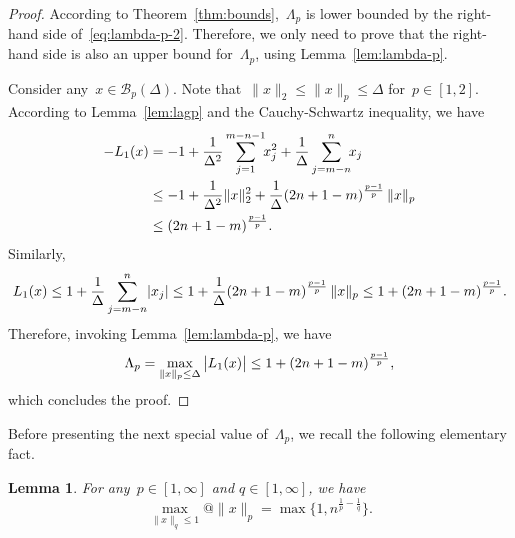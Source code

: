 \documentclass{article}
\numberwithin{equation}{section}
\theoremstyle{definition}
\theoremstyle{plain}
\newtheorem{lemma}{Lemma}[section]
\theoremstyle{remark}
\newcommand*{\abs}[2][]{#1\lvert#2#1\rvert}
\newcommand*{\lagp}[1][]{L\ifblank{#1}{}{_{#1}}}
\newcommand*{\norm}[2][]{#1\lVert#2#1\rVert}
\begin{document}
\begin{proof}
    According to Theorem~\ref{thm:bounds},~$\Lambda_p$ is lower bounded by the right-hand side of~\eqref{eq:lambda-p-2}.
    Therefore, we only need to prove that the right-hand side is also an upper bound for~$\Lambda_p$, using Lemma~\ref{lem:lambda-p}.

    Consider any~$x \in \mathcal{B}_p(\Delta)$. Note that~$\norm{x}_2 \le\norm{x}_p \le \Delta $ for~$p\in[1,2]$.
    According to Lemma~\ref{lem:lagp} and the Cauchy-Schwartz inequality, we have
    \begin{align}
        -\lagp[1](x) &= -1 + \frac{1}{\Delta^2} \sum_{j = 1}^{m - n - 1} \!\! x_j^2 + \frac{1}{\Delta} \sum_{j = m - n}^n \!\! x_j \nonumber\\
        &\le -1 + \frac{1}{\Delta^2}\norm{x}_2^2 + \frac{1}{\Delta} (2n+1-m)^{\frac{p-1}{p}}\, \norm{x}_p \nonumber \\
        & \le (2n+1-m)^{\frac{p-1}{p}} \nonumber. %
    \end{align}
    Similarly,
    \begin{equation*}
        \lagp[1](x) \le 1 + \frac{1}{\Delta}\sum_{j = m - n}^n \abs{x_j} \le 1 + \frac{1}{\Delta}
        (2n + 1 - m)^{\frac{p-1}{p}} \,\norm{x}_p \le 1 + (2n + 1 - m)^{\frac{p-1}{p}}.
    \end{equation*}
    Therefore, invoking Lemma~\ref{lem:lambda-p}, we have
    \begin{equation*}
        \Lambda_p = \max_{\norm{x}_p \le \Delta} \abs[\big]{\lagp[1](x)} \le 1 + (2n + 1 - m)^{\frac{p-1}{p}},
    \end{equation*}
    which concludes the proof.
\end{proof}

Before presenting the next special value of~$\Lambda_p$, we recall the following elementary fact.

\begin{lemma}
    \label{lem:max-norm-pq}
    For any~$p\in[1,\infty]$ and $q \in [1,\infty]$, we have
    \begin{equation}
        \label{eq:max-norm-pq}
        \max_{\norm{x}_q \le 1} @ \norm{x}_p= \max\{1, n^{\frac{1}{p}-\frac{1}{q}}\}.
    \end{equation}
\end{lemma}
\end{document}
